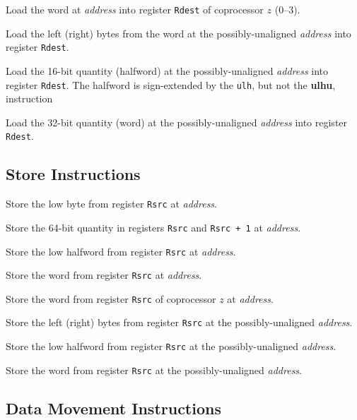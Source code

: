 \documentclass[11pt]{article}
\begin{document}
Load the word at {\em address\/} into register {\tt Rdest} of
coprocessor $z$ (0--3).

Load the left (right) bytes from the word at the possibly-unaligned
{\em address\/} into register {\tt Rdest}.

Load the 16-bit quantity (halfword) at the possibly-unaligned {\em
address\/} into register {\tt Rdest}.  The halfword is sign-extended
by the {\tt ulh}, but not the {\bf ulhu}, instruction

Load the 32-bit quantity (word) at the possibly-unaligned {\em
address\/}  into register {\tt Rdest}.


\subsection {Store Instructions}

Store the low byte from register {\tt Rsrc} at {\em address\/}.

Store the 64-bit quantity in registers {\tt Rsrc} and {\tt Rsrc
+ 1} at {\em address\/}.

Store the low halfword from register {\tt Rsrc} at {\em address\/}.

Store the word from register {\tt Rsrc} at {\em address\/}.

Store the word from register {\tt Rsrc} of coprocessor $z$ at
{\em address\/}.

Store the left (right) bytes from register {\tt Rsrc} at the
possibly-unaligned {\em address\/}.

Store the low halfword from register {\tt Rsrc} at the
possibly-unaligned {\em address\/}.

Store the word from register {\tt Rsrc} at the possibly-unaligned
{\em address\/}.


\subsection{Data Movement Instructions}
\end{document}
